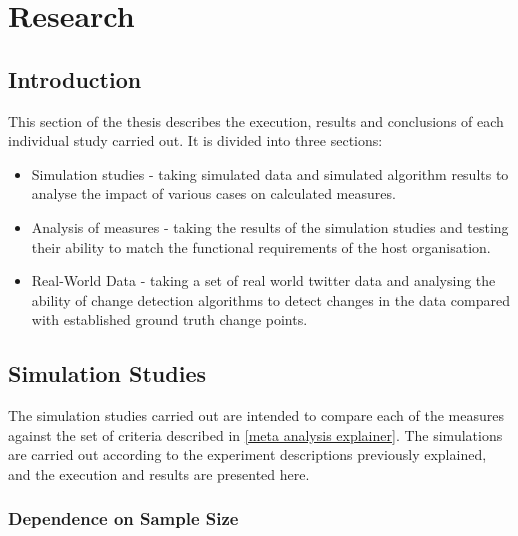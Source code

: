 \documentclass{uvamscse}	%
\begin{document}






\chapter{Research}

\section{Introduction}

This section of the thesis describes the execution, results and conclusions of each individual study carried out. It is divided into three sections:

\begin{itemize}
    \item Simulation studies - taking simulated data and simulated algorithm results to analyse the impact of various cases on calculated measures.
    \item Analysis of measures - taking the results of the simulation studies and testing their ability to match the functional requirements of the host organisation.
    \item Real-World Data - taking a set of real world twitter data and analysing the ability of change detection algorithms to detect changes in the data compared with established ground truth change points.
\end{itemize}

\section{Simulation Studies}

The simulation studies carried out are intended to compare each of the measures against the set of criteria described in \autoref{meta analysis explainer}. The simulations are carried out according to the experiment descriptions previously explained, and the execution and results are presented here.

\subsection{Dependence on Sample Size}
\label{sample size dependence}
\end{document}

